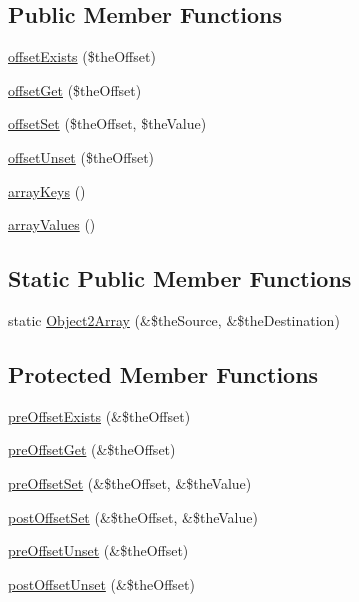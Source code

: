 \subsection*{Public Member Functions}
\begin{DoxyCompactItemize}
\item 
\hyperlink{class_ontology_wrapper_1_1_container_object_aff6fe69abda5124438458b687ab30c4f}{offset\-Exists} (\$the\-Offset)
\item 
\hyperlink{class_ontology_wrapper_1_1_container_object_a1fcd9bbec807c35973f634eb0a98ae13}{offset\-Get} (\$the\-Offset)
\item 
\hyperlink{class_ontology_wrapper_1_1_container_object_ae7c3dbc16f8e0e2bbd667c0168539a3e}{offset\-Set} (\$the\-Offset, \$the\-Value)
\item 
\hyperlink{class_ontology_wrapper_1_1_container_object_a6aec41ee5dafbd52a6e9963eb49f3e7e}{offset\-Unset} (\$the\-Offset)
\item 
\hyperlink{class_ontology_wrapper_1_1_container_object_ae27d07c2dcb4b4e95a167ef9fa6a419a}{array\-Keys} ()
\item 
\hyperlink{class_ontology_wrapper_1_1_container_object_a65780ec62aa8b6e5f699be556f9e316f}{array\-Values} ()
\end{DoxyCompactItemize}
\subsection*{Static Public Member Functions}
\begin{DoxyCompactItemize}
\item 
static \hyperlink{class_ontology_wrapper_1_1_container_object_a0af6d7a3fcaeeb50be636280e95bc2db}{Object2\-Array} (\&\$the\-Source, \&\$the\-Destination)
\end{DoxyCompactItemize}
\subsection*{Protected Member Functions}
\begin{DoxyCompactItemize}
\item 
\hyperlink{class_ontology_wrapper_1_1_container_object_ae03602f378081e220f8e6280d75bdc3e}{pre\-Offset\-Exists} (\&\$the\-Offset)
\item 
\hyperlink{class_ontology_wrapper_1_1_container_object_a7053dffd7fc10440eebfecd74e73d4af}{pre\-Offset\-Get} (\&\$the\-Offset)
\item 
\hyperlink{class_ontology_wrapper_1_1_container_object_ab7d07dda2c4b88ffa98b41d48814d03f}{pre\-Offset\-Set} (\&\$the\-Offset, \&\$the\-Value)
\item 
\hyperlink{class_ontology_wrapper_1_1_container_object_a0fa0ab4b7e742d00f2daa9206aa0b44a}{post\-Offset\-Set} (\&\$the\-Offset, \&\$the\-Value)
\item 
\hyperlink{class_ontology_wrapper_1_1_container_object_ae9f60cec5e7e40aed32c51dd7efa0429}{pre\-Offset\-Unset} (\&\$the\-Offset)
\item 
\hyperlink{class_ontology_wrapper_1_1_container_object_ada715084328ddac15b67491ea7c8e8cb}{post\-Offset\-Unset} (\&\$the\-Offset)
\end{DoxyCompactItemize}


